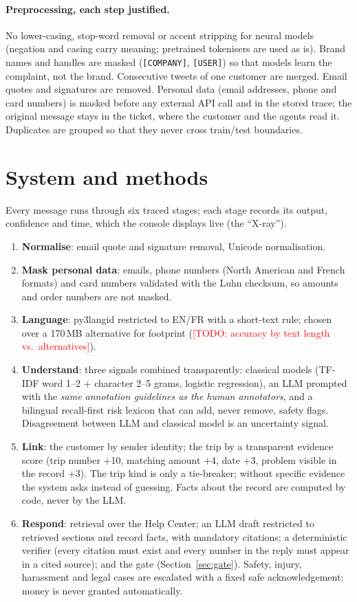 \documentclass[11pt,a4paper]{article}
\newcommand{\todo}[1]{\textcolor{red}{[TODO: #1]}}
\begin{document}
\paragraph{Preprocessing, each step justified.} No lower-casing, stop-word removal or accent
stripping for neural models (negation and casing carry meaning; pretrained tokenisers are used as
is). Brand names and handles are masked (\texttt{[COMPANY]}, \texttt{[USER]}) so that models learn
the complaint, not the brand. Consecutive tweets of one customer are merged. Email quotes and
signatures are removed. Personal data (email addresses, phone and card numbers) is masked before
any external API call and in the stored trace; the original message stays in the ticket, where the
customer and the agents read it.
Duplicates are grouped so that they never cross train/test boundaries.

\section{System and methods}
\label{sec:method}
Every message runs through six traced stages; each stage records its output, confidence and time,
which the console displays live (the ``X-ray'').
\begin{enumerate}
\item \textbf{Normalise}: email quote and signature removal, Unicode normalisation.
\item \textbf{Mask personal data}: emails, phone numbers (North American and French formats) and
card numbers validated with the Luhn checksum, so amounts and order numbers are not masked.
\item \textbf{Language}: py3langid \citep{lui2012langid} restricted to EN/FR with a short-text rule;
chosen over a 170\,MB alternative for footprint (\todo{accuracy by text length vs.\ alternatives}).
\item \textbf{Understand}: three signals combined transparently: classical models (TF-IDF word
1--2 + character 2--5 grams, logistic regression), an LLM prompted with the \emph{same annotation
guidelines as the human annotators}, and a bilingual recall-first risk lexicon that can add, never
remove, safety flags. Disagreement between LLM and classical model is an uncertainty signal.
\item \textbf{Link}: the customer by sender identity; the trip by a transparent evidence score
(trip number +10, matching amount +4, date +3, problem visible in the record +3). The trip kind is
only a tie-breaker; without specific evidence the system asks instead of guessing. Facts about the
record are computed by code, never by the LLM.
\item \textbf{Respond}: retrieval over the Help Center; an LLM draft restricted to retrieved
sections and record facts, with mandatory citations; a deterministic verifier (every citation must
exist and every number in the reply must appear in a cited source); and the gate (Section~\ref{sec:gate}).
Safety, injury, harassment and legal cases are escalated with a fixed safe acknowledgement; money is
never granted automatically.
\end{enumerate}
\end{document}
